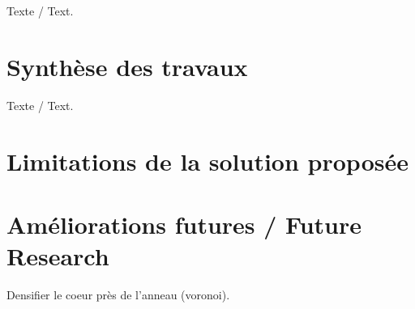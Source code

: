 \label{sec:Conclusion}
Texte / Text.

\section{Synthèse des travaux}
Texte / Text.

\section{Limitations de la solution proposée}\label{sec:Limitations}



\section{Améliorations futures / Future Research}

Densifier le coeur près de l'anneau (voronoi).
